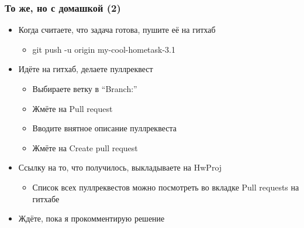 \documentclass[xetex,mathserif,serif]{beamer}
\begin{document}
	\begin{frame}
		\frametitle{То же, но с домашкой (2)}
		\begin{itemize}
			\item Когда считаете, что задача готова, пушите её на гитхаб
			\begin{itemize}
				\item git push -u origin my-cool-hometask-3.1
			\end{itemize}
			\item Идёте на гитхаб, делаете пуллреквест
			\begin{itemize}
				\item Выбираете ветку в ``Branch:''
				\item Жмёте на Pull request
				\item Вводите внятное описание пуллреквеста
				\item Жмёте на Create pull request
			\end{itemize}
			\item Ссылку на то, что получилось, выкладываете на HwProj
			\begin{itemize}
				\item Список всех пуллреквестов можно посмотреть во вкладке Pull requests на гитхабе
			\end{itemize}
			\item Ждёте, пока я прокомментирую решение
		\end{itemize}
	\end{frame}
\end{document}
